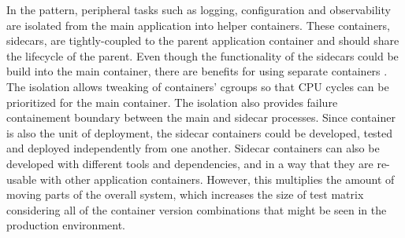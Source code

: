 \documentclass[english,12pt,a4paper,pdftex,sci,utf8]{aaltothesis}
\begin{document}

In the pattern, peripheral tasks such as logging, configuration and observability are isolated from the main application into helper containers. These containers, sidecars, are tightly-coupled to the parent application container and should share the lifecycle of the parent. Even though the functionality of the sidecars could be build into the main container, there are benefits for using separate containers \cite{burns2016design}. The isolation allows tweaking of containers' cgroups so that CPU cycles can be prioritized for the main container. The isolation also provides failure containement boundary between the main and sidecar processes. Since container is also the unit of deployment, the sidecar containers could be developed, tested and deployed independently from one another. Sidecar containers can also be developed with different tools and dependencies, and in a way that they are re-usable with other application containers. However, this multiplies the amount of moving parts of the overall system, which increases the size of test matrix considering all of the container version combinations that might be seen in the production environment.
\end{document}
